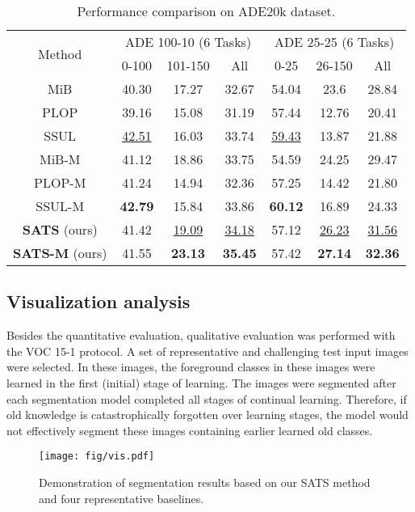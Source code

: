 \documentclass[onecolumn,conference,compsoc]{IEEEtran}
\begin{document}
\begin{spacing}{1.5}
\begin{table*}[t]
\caption{\normalsize Performance comparison on ADE20k dataset. }
\centering
\resizebox{0.6\linewidth}{!}
{ \begin{tabular}{ c|ccc|ccc } 
\toprule
\multirow{2}{*}{Method}& \multicolumn{3}{c|}{ADE 100-10 (6 Tasks)} & \multicolumn{3}{c}{ADE 25-25 (6 Tasks)}\\
& 0-100 & 101-150 & All & 0-25 & 26-150 & All \\ 
\midrule
MiB & 40.30 & 17.27 & 32.67 & 54.04 & 23.6 & 28.84\\
PLOP & 39.16 & 15.08 & 31.19 & 57.44 & 12.76 & 20.41 \\
SSUL & \underline{42.51} & 16.03 & 33.74 & \underline{59.43} & 13.87 & 21.88\\
\midrule
MiB-M & 41.12 & 18.86 & 33.75 & 54.59 & 24.25 & 29.47 \\
PLOP-M &  41.24 & 14.94 & 32.36 & 57.25 & 14.42 & 21.80\\
SSUL-M & \textbf{42.79} & 15.84 & 33.86 & \textbf{60.12} & 16.89 & 24.33\\
\midrule
\textbf{SATS} (ours) & 41.42 & \underline{19.09} & \underline{34.18} & 57.12 & \underline{26.23} & \underline{31.56}\\
\textbf{SATS-M} (ours) &  41.55 & \textbf{23.13} & \textbf{35.45} & 57.42 &\textbf{27.14}& \textbf{32.36}\\
\bottomrule
\end{tabular}
} \label{tab:ADE}
\end{table*}

\subsection{Visualization analysis}

Besides the quantitative evaluation, qualitative evaluation was performed with the VOC 15-1 protocol. A set of representative and challenging test input images were selected.  {In these images,} the foreground classes in these images were learned in the first (initial) stage of learning. The images  {were segmented after} each segmentation model completed all stages of continual learning. Therefore, if {old knowledge is catastrophically forgotten} over learning stages, the model would not  {effectively} segment these images containing earlier learned old classes.

\begin{figure*}[hbt]
    \centering
    \texttt{[image: fig/vis.pdf]}
    \caption{\normalsize Demonstration of segmentation results based on our SATS method and four representative baselines. }
    \label{fig:vis}
\end{figure*}


\end{spacing}
\end{document}
